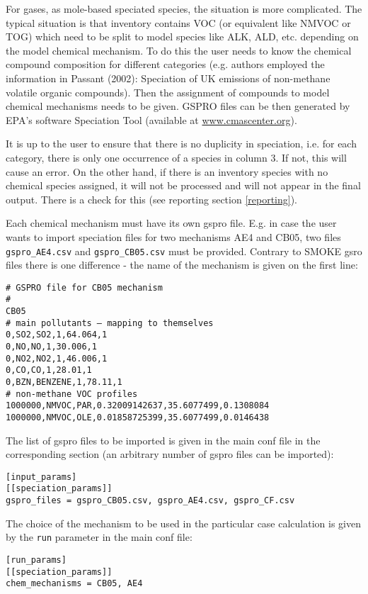 \documentclass[a4paper,11pt]{article}
\begin{document}
For gases, as mole-based speciated species, the situation is more
complicated. The typical situation is that inventory contains VOC (or
equivalent like NMVOC or TOG) which need to be split to model
species like ALK, ALD, etc. depending on the model chemical mechanism. To
do this the user needs to know the chemical compound composition for different
categories (e.g. authors employed the information in Passant (2002):
Speciation of UK emissions of non-methane volatile organic compounds).
Then the assignment of compounds to model chemical mechanisms needs to
be given. GSPRO files can be then generated by EPA's software Speciation Tool (available at \url{www.cmascenter.org}).

It is up to the user to ensure that there is no duplicity in speciation, i.e. for each category, there is only one occurrence of a species in column 3. If not, this will cause an error. On the other hand, if there is an inventory species with no chemical species assigned, it will not be processed and will not appear in the final output. There is a check for this (see reporting section \ref{reporting}). 

Each chemical mechanism must have its own gspro file. E.g. in case the user wants to import speciation files for two mechanisms AE4 and CB05, two files \verb|gspro_AE4.csv| and \verb|gspro_CB05.csv| must be provided. Contrary to SMOKE gsro files there is one difference - the name of the mechanism is given on the first line:
\begin{verbatim}
# GSPRO file for CB05 mechanism
#
CB05
# main pollutants – mapping to themselves
0,SO2,SO2,1,64.064,1
0,NO,NO,1,30.006,1
0,NO2,NO2,1,46.006,1
0,CO,CO,1,28.01,1
0,BZN,BENZENE,1,78.11,1
# non-methane VOC profiles
1000000,NMVOC,PAR,0.32009142637,35.6077499,0.1308084
1000000,NMVOC,OLE,0.01858725399,35.6077499,0.0146438
\end{verbatim}
The list of gspro files to be imported is given in the main conf file in the corresponding section (an arbitrary number of gspro files can be imported):
\begin{verbatim}
[input_params]
[[speciation_params]]
gspro_files = gspro_CB05.csv, gspro_AE4.csv, gspro_CF.csv
\end{verbatim}
The choice of the mechanism to be used in the particular case calculation is given by the \verb|run| parameter in the main conf file:
\begin{verbatim}
[run_params]
[[speciation_params]]
chem_mechanisms = CB05, AE4        
\end{verbatim}
\end{document}
